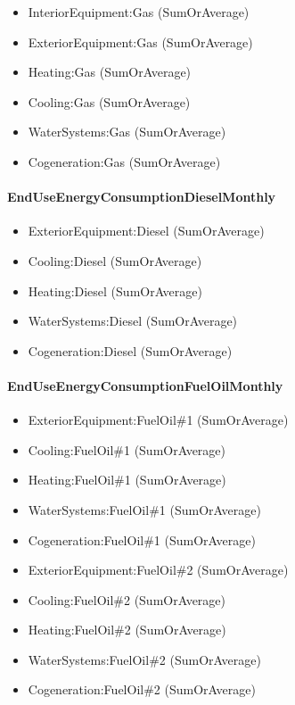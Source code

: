 \begin{itemize}
\item
  InteriorEquipment:Gas (SumOrAverage)
\item
  ExteriorEquipment:Gas (SumOrAverage)
\item
  Heating:Gas (SumOrAverage)
\item
  Cooling:Gas (SumOrAverage)
\item
  WaterSystems:Gas (SumOrAverage)
\item
  Cogeneration:Gas (SumOrAverage)
\end{itemize}

\paragraph{EndUseEnergyConsumptionDieselMonthly}\label{enduseenergyconsumptiondieselmonthly}

\begin{itemize}
\item
  ExteriorEquipment:Diesel (SumOrAverage)
\item
  Cooling:Diesel (SumOrAverage)
\item
  Heating:Diesel (SumOrAverage)
\item
  WaterSystems:Diesel (SumOrAverage)
\item
  Cogeneration:Diesel (SumOrAverage)
\end{itemize}

\paragraph{EndUseEnergyConsumptionFuelOilMonthly}\label{enduseenergyconsumptionfueloilmonthly}

\begin{itemize}
\item
  ExteriorEquipment:FuelOil\#1 (SumOrAverage)
\item
  Cooling:FuelOil\#1 (SumOrAverage)
\item
  Heating:FuelOil\#1 (SumOrAverage)
\item
  WaterSystems:FuelOil\#1 (SumOrAverage)
\item
  Cogeneration:FuelOil\#1 (SumOrAverage)
\item
  ExteriorEquipment:FuelOil\#2 (SumOrAverage)
\item
  Cooling:FuelOil\#2 (SumOrAverage)
\item
  Heating:FuelOil\#2 (SumOrAverage)
\item
  WaterSystems:FuelOil\#2 (SumOrAverage)
\item
  Cogeneration:FuelOil\#2 (SumOrAverage)
\end{itemize}

